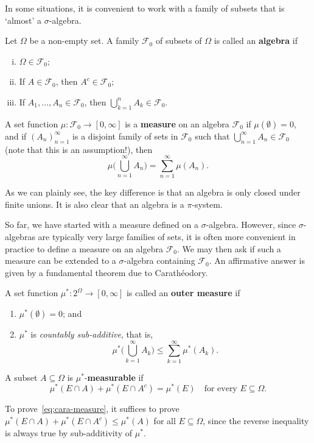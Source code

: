 In some situations, it is convenient to work with a family of subsets that is `almost' a $\sigma$-algebra.
\begin{definition}
    Let $\Omega$ be a non-empty set. A family $\mathcal{F}_0$ of subsets of $\Omega$ is called an \textbf{algebra} if
    \begin{enumerate}[(i)]
        \item $\Omega\in\mathcal{F}_0$;
        \item If $A\in\mathcal{F}_0$, then $A^c\in\mathcal{F}_0$;
        \item If $A_1,\ldots, A_n\in\mathcal{F}_0$, then $\bigcup_{k=1}^n A_k\in\mathcal{F}_0$.
    \end{enumerate}
    A set function $\mu:\mathcal{F}_0 \to [0,\infty]$ is a \textbf{measure} on an algebra $\mathcal{F}_0$ if $\mu(\emptyset) = 0$, and if $(A_n)_{n=1}^\infty$ is a disjoint family of sets in $\mathcal{F}_0$ such that $\bigcup_{n=1}^\infty A_n \in \mathcal{F}_0$ (note that this is an assumption!), then
    \begin{equation*}
        \mu\bigg(\bigcup_{n=1}^\infty A_n\bigg) = \sum_{n=1}^\infty \mu(A_n).
    \end{equation*}
\end{definition}
As we can plainly see, the key difference is that an algebra is only closed under finite unions. It is also clear that an algebra is a $\pi$-system.

So far, we have started with a measure defined on a $\sigma$-algebra. However, since $\sigma$-algebras are typically very large families of sets, it is often more convenient in practice to define a measure on an algebra $\mathcal{F}_0$. We may then ask if such a measure can be extended to a $\sigma$-algebra containing $\mathcal{F}_0$. An affirmative answer is given by a fundamental theorem due to Carath\'{e}odory.

\begin{definition}
    A set function $\mu^*:2^{\Omega}\to [0,\infty]$ is called an \textbf{outer measure} if
    \begin{enumerate}[\upshape (i)]
        \item $\mu^*(\emptyset)=0$; and
        \item $\mu^*$ is \emph{countably sub-additive}, that is,
        \begin{equation*}
            \mu^*\bigg(\bigcup_{k=1}^\infty A_k\bigg) \le \sum_{k=1}^\infty \mu^*(A_k).
        \end{equation*}
    \end{enumerate}
    A subset $A\subseteq\Omega$ is $\mu^*$-\textbf{measurable} if
    \begin{equation}
    \label{eq:cara-measure}
        \mu^*(E\cap A) + \mu^*(E\cap A^c) = \mu^*(E) \quad\text{for every } E\subseteq\Omega.
    \end{equation}
\end{definition}
To prove~\eqref{eq:cara-measure}, it suffices to prove $\mu^*(E\cap A)+\mu^*(E\cap A^c)\le \mu^*(A)$ for all $E\subseteq\Omega$, since the reverse inequality is always true by sub-additivity of $\mu^*$.

